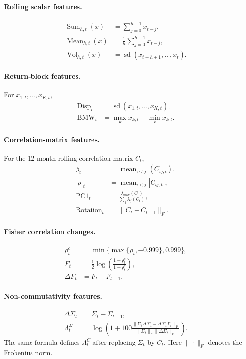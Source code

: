 \paragraph{Rolling scalar features.}
\begin{align}
\operatorname{Sum}_{h,t}(x)
&=
\sum_{j=0}^{h-1}x_{t-j}, \\
\operatorname{Mean}_{h,t}(x)
&=
\frac{1}{h}\sum_{j=0}^{h-1}x_{t-j}, \\
\operatorname{Vol}_{h,t}(x)
&=
\operatorname{sd}(x_{t-h+1},\ldots,x_t).
\end{align}

\paragraph{Return-block features.}
For \(x_{1,t},\ldots,x_{K,t}\),
\begin{align}
\operatorname{Disp}_{t}
&=
\operatorname{sd}(x_{1,t},\ldots,x_{K,t}), \\
\operatorname{BMW}_{t}
&=
\max_{k}x_{k,t}-\min_{k}x_{k,t}.
\end{align}

\paragraph{Correlation-matrix features.}
For the 12-month rolling correlation matrix \(C_t\),
\begin{align}
\overline{\rho}_{t}
&=
\operatorname{mean}_{i<j}(C_{ij,t}), \\
\overline{|\rho|}_{t}
&=
\operatorname{mean}_{i<j}|C_{ij,t}|, \\
\operatorname{PC1}_{t}
&=
\frac{\lambda_{\max}(C_t)}
{\sum_j\lambda_j(C_t)}, \\
\operatorname{Rotation}_{t}
&=
\|C_t-C_{t-1}\|_F .
\end{align}

\paragraph{Fisher correlation changes.}
\begin{align}
\rho_t^{c}
&=
\min\{\max\{\rho_t,-0.999\},0.999\}, \\
F_t
&=
\frac{1}{2}\log\!\left(\frac{1+\rho_t^{c}}{1-\rho_t^{c}}\right), \\
\Delta F_t
&=
F_t-F_{t-1}.
\end{align}

\paragraph{Non-commutativity features.}
\begin{align}
\Delta\Sigma_t
&=
\Sigma_t-\Sigma_{t-1}, \\
\Lambda^{\Sigma}_t
&=
\log\!\left(
1+
100
\frac{
\|\Sigma_t\Delta\Sigma_t-\Delta\Sigma_t\Sigma_t\|_F
}{
\|\Sigma_t\|_F\|\Delta\Sigma_t\|_F
}
\right).
\end{align}
The same formula defines \(\Lambda^{C}_t\) after replacing \(\Sigma_t\) by \(C_t\). Here \(\|\cdot\|_F\) denotes the Frobenius norm.

